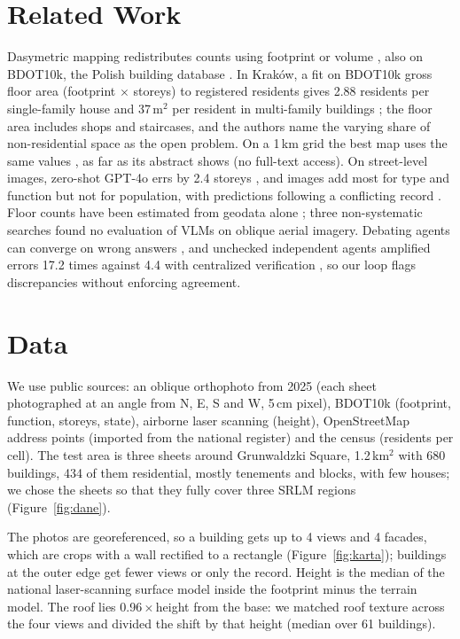 \documentclass[11pt]{article}
\begin{document}
\section{Related Work}

Dasymetric mapping redistributes counts using footprint or volume \citep{mennis2003generating,lwin2009gis,ural2011building}, also on BDOT10k, the Polish building database \citep{calka2016redistribution}.
In Kraków, a fit on BDOT10k gross floor area (footprint $\times$ storeys) to registered residents gives 2.88 residents per single-family house and 37\,m$^2$ per resident in multi-family buildings \citep{pirowski2018detailed}; the floor area includes shops and staircases, and the authors name the varying share of non-residential space as the open problem.
On a 1\,km grid the best map uses the same values \citep{pirowski2024dasymetric}, as far as its abstract shows (no full-text access).
On street-level images, zero-shot GPT-4o errs by 2.4 storeys \citep{openfacades2025}, and images add most for type and function but not for population, with predictions following a conflicting record \citep{tan2026streetview}.
Floor counts have been estimated from geodata alone \citep{moubayed2025floors}; three non-systematic searches found no evaluation of VLMs on oblique aerial imagery.
Debating agents can converge on wrong answers \citep{du2024debate}, and unchecked independent agents amplified errors 17.2 times against 4.4 with centralized verification \citep{kim2025scaling}, so our loop flags discrepancies without enforcing agreement.

\section{Data}

We use public sources: an oblique orthophoto from 2025 (each sheet photographed at an angle from N, E, S and W, 5\,cm pixel), BDOT10k (footprint, function, storeys, state), airborne laser scanning (height), OpenStreetMap address points (imported from the national register) and the census (residents per cell).
The test area is three sheets around Grunwaldzki Square, 1.2\,km$^2$ with 680 buildings, 434 of them residential, mostly tenements and blocks, with few houses; we chose the sheets so that they fully cover three SRLM regions (Figure~\ref{fig:dane}).

The photos are georeferenced, so a building gets up to 4 views and 4 facades, which are crops with a wall rectified to a rectangle (Figure~\ref{fig:karta}); buildings at the outer edge get fewer views or only the record.
Height is the median of the national laser-scanning surface model inside the footprint minus the terrain model.
The roof lies 0.96\,$\times$\,height from the base: we matched roof texture across the four views and divided the shift by that height (median over 61 buildings).
\end{document}
